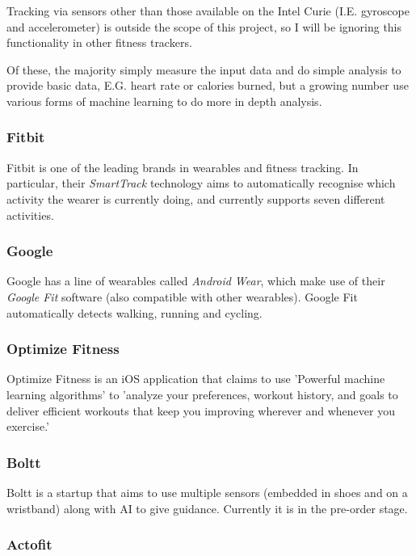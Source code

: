 \documentclass[a4paper]{article}
\begin{document}
Tracking via sensors other than those available on the Intel Curie (I.E. gyroscope and accelerometer) is outside the scope of this project, so I will be ignoring this functionality in other fitness trackers.

Of these, the majority simply measure the input data and do simple analysis to provide basic data, E.G. heart rate or calories burned, but a growing number use various forms of machine learning to do more in depth analysis. 

\subsubsection{Fitbit}

Fitbit is one of the leading brands in wearables and fitness tracking. In particular, their \textit{SmartTrack}\cite{bgref8} technology aims to automatically recognise which activity the wearer is currently doing, and currently supports seven different activities.

\subsubsection{Google}

Google has a line of wearables called \textit{Android Wear}\cite{bgref9}, which make use of their \textit{Google Fit}\cite{bgref10} software (also compatible with other wearables).
Google Fit automatically detects walking, running and cycling.

\subsubsection{Optimize Fitness}

Optimize Fitness\cite{bgref11} is an iOS application that claims to use 'Powerful machine learning algorithms' to 'analyze your preferences, workout history, and goals to deliver efficient workouts that keep you improving wherever and whenever you exercise.'

\subsubsection{Boltt}

Boltt\cite{bgref12} is a startup that aims to use multiple sensors (embedded in shoes and on a wristband) along with AI to give guidance. Currently it is in the pre-order stage.

\subsubsection{Actofit}
\end{document}
